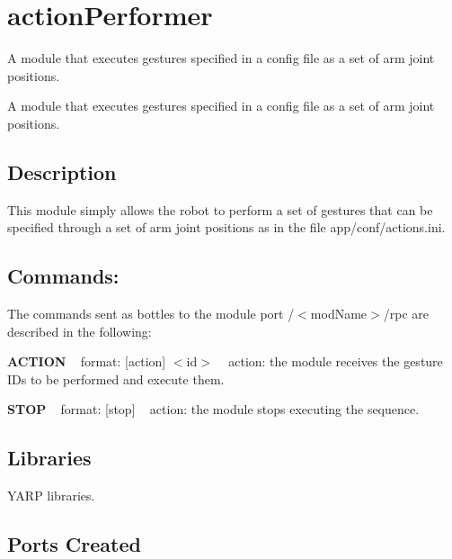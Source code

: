 \section{action\+Performer}
\label{group__actionPerformer}


A module that executes gestures specified in a config file as a set of arm joint positions.  


A module that executes gestures specified in a config file as a set of arm joint positions. 

\hypertarget{group__gestureRecognitionStereo_intro_sec}{}\subsection{Description}\label{group__gestureRecognitionStereo_intro_sec}
This module simply allows the robot to perform a set of gestures that can be specified through a set of arm joint positions as in the file app/conf/actions.\+ini.\hypertarget{group__gestureRecognitionStereo_rpc_port}{}\subsection{Commands\+:}\label{group__gestureRecognitionStereo_rpc_port}
The commands sent as bottles to the module port /$<$mod\+Name$>$/rpc are described in the following\+:

{\bfseries A\+C\+T\+I\+ON} ~\newline
format\+: \mbox{[}action\mbox{]} $<$id$>$ ~\newline
action\+: the module receives the gesture I\+Ds to be performed and execute them.

{\bfseries S\+T\+OP} ~\newline
format\+: \mbox{[}stop\mbox{]} ~\newline
action\+: the module stops executing the sequence.\hypertarget{group__gestureRecognitionStereo_lib_sec}{}\subsection{Libraries}\label{group__gestureRecognitionStereo_lib_sec}

\begin{DoxyItemize}
\item Y\+A\+RP libraries.
\end{DoxyItemize}\hypertarget{group__gestureRecognitionStereo_portsc_sec}{}\subsection{Ports Created}\label{group__gestureRecognitionStereo_portsc_sec}

